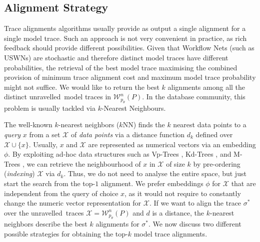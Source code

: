 
\ifdefined\DEBUG
\newcommand{\unravelled}{unravelled}
\newcommand{\unravelling}{unravelling}
\newcommand{\unravel}{unravel}
\else
\newcommand{\unravelled}{unfolded}
\newcommand{\unravelling}{unfolding}
\newcommand{\unravel}{unfold}
\fi

\subsection{Alignment Strategy}
Trace alignments algorithms usually provide as output a single alignment for a single model trace. Such an approach is not very convenient in practice, as rich feedback should provide different possibilities. Given that Workflow Nets (such as USWNs) are stochastic and therefore distinct model traces have different probabilities, the retrieval of the best model trace maximising the combined provision of minimum trace alignment cost and maximum model trace probability might not suffice. We would
like to return the best $k$ alignments among all the distinct \unravelled\ model traces in $\mathcal{W}^n_{p_\theta}(P)$. In the database community, this problem is usually tackled via $k$-Nearest Neighbours.

The well-known $k$-nearest neighbors ($k$NN) \cite{Altman} finds the $k$ nearest data points to a \textit{query} $x$ from a set $\mathcal{X}$ of \textit{data points} via a distance function $d_k$ defined over $\mathcal{X}\cup\{x\}$. Usually, $x$ and $\mathcal{X}$ are represented as numerical vectors via an embedding $\phi$. {By exploiting ad-hoc data structures such as Vp-Trees \cite{Fu2000}, Kd-Trees \cite{Maneewongvatana99}, and M-Trees \cite{Ciaccia}, we can retrieve the neighbourhood of $x$ in $\mathcal{X}$ of size $k$  by pre-ordering (\textit{indexing}) $\mathcal{X}$  via $d_k$. Thus, we do not need to analyse the entire space, but just start the search from the top-$1$ alignment. We prefer embeddings $\phi$ for $\mathcal{X}$ that are independent from the query of choice $x$, as it would not require to constantly change the numeric vector representation for $\mathcal{X}$.
%	
If we want to align the trace $\sigma^*$ over the \unravelled\ traces $\mathcal{X}=\mathcal{W}^n_{p_\theta}(P)$ and $d$ is a distance, the $k$-nearest neighbors describe the best $k$ alignments for $\sigma^*$.} We now discuss two different possible strategies for obtaining the top-$k$ model trace alignments.

